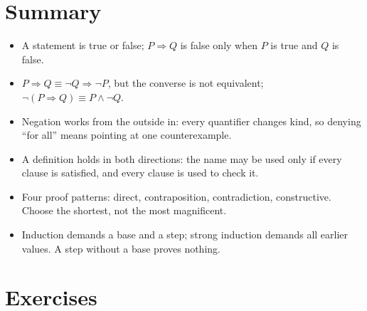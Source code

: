 \section{Summary}

\begin{ringkasan}
\begin{itemize}
  \item A statement is true or false; $P \Rightarrow Q$ is false only when $P$ is
        true and $Q$ is false.
  \item $P \Rightarrow Q \equiv \neg Q \Rightarrow \neg P$, but the converse is not
        equivalent; $\neg(P \Rightarrow Q) \equiv P \wedge \neg Q$.
  \item Negation works from the outside in: every quantifier changes kind, so
        denying ``for all'' means pointing at one counterexample.
  \item A definition holds in both directions: the name may be used only if every clause
        is satisfied, and every clause is used to check it.
  \item Four proof patterns: direct, contraposition, contradiction, constructive. Choose
        the shortest, not the most magnificent.
  \item Induction demands a base and a step; strong induction demands all earlier
        values. A step without a base proves nothing.
\end{itemize}
\end{ringkasan}

\section{Exercises}

